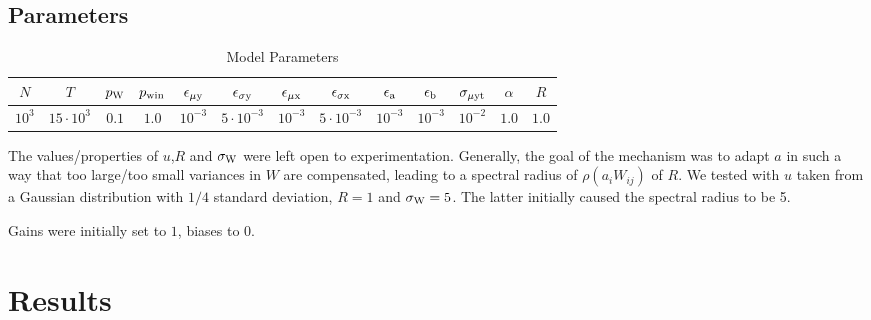 \documentclass[12pt]{article}
\begin{document}
\subsection{Parameters}

\begin{table}[h]
	\centering
	\renewcommand{\arraystretch}{1.5}
	\caption{Model Parameters}
	\hskip 5pt
	\begin{tabular}{c|c|c|c|c|c|c|c|c|c|c|c|c}
		$N$ & $T$ & $p_{\rm W}$ & $p_{\rm w in}$ & $\epsilon_{\rm \mu y}$ &  $\epsilon_{\rm \sigma y}$ & $\epsilon_{\rm \mu x}$ & $\epsilon_{\rm \sigma x}$ & $\epsilon_{\rm a}$ & $\epsilon_{\rm b}$ & $\sigma_{\rm \mu y t}$ & $\alpha$ & $R$ \\
		\hline
		$10^3$&$15\cdot10^3$&$0.1$&$1.0$&$10^{-3}$&$5\cdot10^{-3}$&$10^{-3}$&$5\cdot10^{-3}$&$10^{-3}$&$10^{-3}$&$10^{-2}$&$1.0$&$1.0$
	\end{tabular}
	\label{tab:params}
\end{table}

The values/properties of $u$,$R$ and $\sigma_{\rm W}$ were left open to experimentation. Generally, the goal of the mechanism was to adapt $a$ in such a way that too large/too small variances in $W$ are compensated, leading to a spectral radius of $\rho\left(a_i W_{ij}\right)$ of $R$. We tested with $u$ taken from a Gaussian distribution with $1/4$ standard deviation, $R=1$ and $\sigma_{\rm W} = 5$. The latter initially caused the spectral radius to be 5.

Gains were initially set to $1$, biases to $0$.
\newpage
\section{Results}
\end{document}
